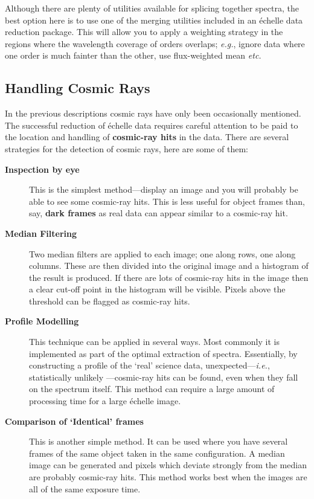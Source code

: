 \documentclass[twoside,11pt]{article}
\newcommand{\htmlref}[2]{#1}
\newcommand{\xlabel}[1]{}
\newcommand{\sgspec}[2]{#1}
\newcommand{\sgspec}[2]{#2}
\begin{document}
Although there are plenty of utilities available for splicing together
spectra, the best option here is to use one of the merging utilities
included in an \'{e}chelle data reduction package.  This will allow you
to apply a weighting strategy in the regions where the wavelength
coverage of orders overlaps; {\em e.g.}, ignore data where one order is
much fainter than the other, use flux-weighted mean {\em etc.}


\subsection{\label{se_cosmic_rays}\xlabel{cosmic_rays}Handling Cosmic Rays}

In the previous descriptions cosmic rays have only been occasionally
mentioned.  The successful reduction of \'{e}chelle data requires
careful attention to be paid to the location and handling of
\htmlref{{\bf cosmic-ray hits}}{gl_cosmic_ray} in the data.
There are several strategies for the detection of cosmic rays, here are
some of them:

\begin{description}

\item [{\bf Inspection by eye}]
      This is the simplest method\sgspec{---}{ - }display an image and you will
      probably be able to see some cosmic-ray hits.  This is less useful
      for object frames than, say, \htmlref{{\bf dark frames}}{gl_dark_frame}
      as real data can appear similar to a cosmic-ray hit.

\item [{\bf Median Filtering}]
      Two median filters are applied to each image; one along rows, one
      along columns.  These are then divided into the original image and
      a histogram of the result is produced.  If there are lots of
      cosmic-ray hits in the image then a clear cut-off point in the
      histogram will be visible.  Pixels above the threshold can be
      flagged as cosmic-ray hits.

\item [{\bf Profile Modelling}]
      This technique can be applied in several ways.  Most commonly it
      is implemented as part of the optimal extraction of spectra.
      Essentially, by constructing a profile of the `real' science data,
      unexpected\sgspec{---}{ - }{\em i.e.}, statistically unlikely
      \sgspec{---}{ - }cosmic-ray hits
      can be found, even when they fall on the spectrum itself.  This
      method can require a large amount of processing time for a large
      \'{e}chelle image.

\item [{\bf Comparison of `Identical' frames}]
      This is another simple method.  It can be used where you have
      several frames of the same object taken in the same configuration.
      A median image can be generated and pixels which deviate strongly
      from the median are probably cosmic-ray hits.  This method works
      best when the images are all of the same exposure time.

\end{description}
\end{document}
